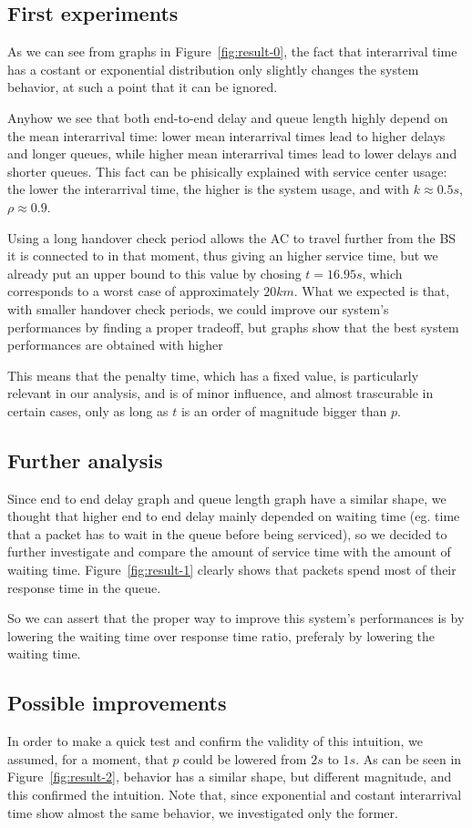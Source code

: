 \documentclass[a4paper,12pt]{article}
\begin{document}
\subsection{First experiments}
As we can see from graphs in Figure~\ref{fig:result-0}, the fact that interarrival time has a costant or exponential distribution only slightly changes the system behavior, at such a point that it can be ignored.

Anyhow we see that both end-to-end delay and queue length highly depend on the mean interarrival time: lower mean interarrival times lead to higher delays and longer queues, while higher mean interarrival times lead to lower delays and shorter queues.
This fact can be phisically explained with service center usage: the lower the interarrival time, the higher is the system usage, and with $k \approx 0.5s$, $\rho \approx 0.9$.

Using a long handover check period allows the AC to travel further from the BS it is connected to in that moment, thus giving an higher service time, but we already put an upper bound to this value by chosing $t = 16.95s$, which corresponds to a worst case of approximately $20 km$.
What we expected is that, with smaller handover check periods, we could improve our system's performances by finding a proper tradeoff, but graphs show that the best system performances are obtained with higher

This means that the penalty time, which has a fixed value, is particularly relevant in our analysis, and is of minor influence, and almost trascurable in certain cases, only as long as $t$ is an order of magnitude bigger than $p$.

\subsection{Further analysis}
Since end to end delay graph and queue length graph have a similar shape, we thought that higher end to end delay mainly depended on waiting time (eg. time that a packet has to wait in the queue before being serviced), so we decided to further investigate and compare the amount of service time with the amount of waiting time.
Figure~\ref{fig:result-1} clearly shows that packets spend most of their response time in the queue.

So we can assert that the proper way to improve this system's performances is by lowering the waiting time over response time ratio, preferaly by lowering the waiting time.

\subsection{Possible improvements}
In order to make a quick test and confirm the validity of this intuition, we assumed, for a moment, that $p$ could be lowered from $2s$ to $1s$.
As can be seen in Figure~\ref{fig:result-2}, behavior has a similar shape, but different magnitude, and this confirmed the intuition.
Note that, since exponential and costant interarrival time show almost the same behavior, we investigated only the former.
\end{document}
